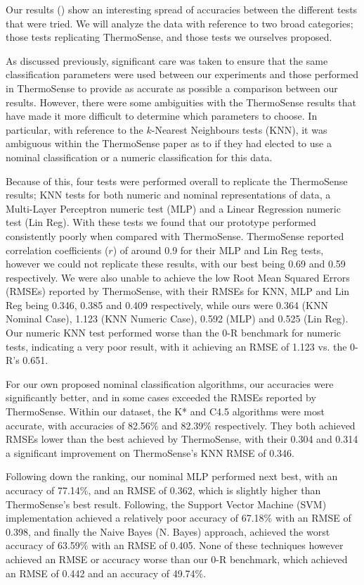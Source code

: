 \documentclass[../thesis/thesis.tex]{subfiles}
\begin{document}
Our results () show an interesting spread of accuracies between the different tests that were tried. We will analyze the data with reference to two broad categories; those tests replicating ThermoSense, and those tests we ourselves proposed.

As discussed previously, significant care was taken to ensure that the same classification parameters were used between our experiments and those performed in ThermoSense to provide as accurate as possible a comparison between our results. However, there were some ambiguities with the ThermoSense results that have made it more difficult to determine which parameters to choose. In particular, with reference to the $k$-Nearest Neighbours tests (KNN), it was ambiguous within the ThermoSense paper as to if they had elected to use a nominal classification or a numeric classification for this data.

Because of this, four tests were performed overall to replicate the ThermoSense results; KNN tests for both numeric and nominal representations of data, a Multi-Layer Perceptron numeric test (MLP) and a Linear Regression numeric test (Lin Reg). With these tests we found that our prototype performed consistently poorly when compared with ThermoSense. ThermoSense reported correlation coefficients ($r$) of around 0.9 for their MLP and Lin Reg tests, however we could not replicate these results, with our best being 0.69 and 0.59 respectively. We were also unable to achieve the low Root Mean Squared Errors (RMSEs) reported by ThermoSense, with their RMSEs for KNN, MLP and Lin Reg being 0.346, 0.385 and 0.409 respectively, while ours were 0.364 (KNN Nominal Case), 1.123 (KNN Numeric Case), 0.592 (MLP) and 0.525 (Lin Reg). Our numeric KNN test performed worse than the 0-R benchmark for numeric tests, indicating a very poor result, with it achieving an RMSE of 1.123 vs. the 0-R's 0.651.

For our own proposed nominal classification algorithms, our accuracies were significantly better, and in some cases exceeded the RMSEs reported by ThermoSense. Within our dataset, the K* and C4.5 algorithms were most accurate, with accuracies of 82.56\% and 82.39\% respectively. They both achieved RMSEs lower than the best achieved by ThermoSense, with their 0.304 and 0.314 a significant improvement on ThermoSense's KNN RMSE of 0.346.

Following down the ranking, our nominal MLP performed next best, with an accuracy of 77.14\%, and an RMSE of 0.362, which is slightly higher than ThermoSense's best result. Following, the Support Vector Machine (SVM) implementation achieved a relatively poor accuracy of 67.18\% with an RMSE of 0.398, and finally the Naive Bayes (N. Bayes) approach, achieved the worst accuracy of 63.59\% with an RMSE of 0.405. None of these techniques however achieved an RMSE or accuracy worse than our 0-R benchmark, which achieved an RMSE of 0.442 and an accuracy of 49.74\%.
\end{document}
